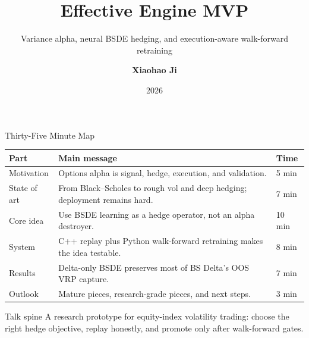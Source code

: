 \documentclass[11pt,aspectratio=169]{beamer}
\title[Effective Engine MVP]{Effective Engine MVP}
\subtitle{Variance alpha, neural BSDE hedging, and execution-aware walk-forward retraining}
\author[X. Ji]{\textbf{Xiaohao Ji}}
\institute[Independent Project]{
    Project report -- 30--45 minutes\\[4pt]
    C++ options trading engine + Python research pipeline
}
\date{2026}
\newcommand{\1}{\mathbf{1}}
\newcommand{\BS}{Black--Scholes}
\begin{document}
\begin{frame}
    \titlepage
\end{frame}

\begin{frame}{Thirty-Five Minute Map}
    \scriptsize
    \begin{center}
    \begin{tabular}{p{}p{}p{}}
        \toprule
        \textbf{Part} & \textbf{Main message} & \textbf{Time} \\
        \midrule
        Motivation & Options alpha is signal, hedge, execution, and validation. & 5 min \\
        State of art & From \BS{} to rough vol and deep hedging; deployment remains hard. & 7 min \\
        Core idea & Use BSDE learning as a hedge operator, not an alpha destroyer. & 10 min \\
        System & C++ replay plus Python walk-forward retraining makes the idea testable. & 8 min \\
        Results & Delta-only BSDE preserves most of BS Delta's OOS VRP capture. & 7 min \\
        Outlook & Mature pieces, research-grade pieces, and next steps. & 3 min \\
        \bottomrule
    \end{tabular}
    \end{center}
    \vspace{2pt}
    \begin{block}{Talk spine}
    A research prototype for equity-index volatility trading: choose the right hedge objective, replay honestly, and promote only after walk-forward gates.
    \end{block}
\end{frame}
\end{document}
